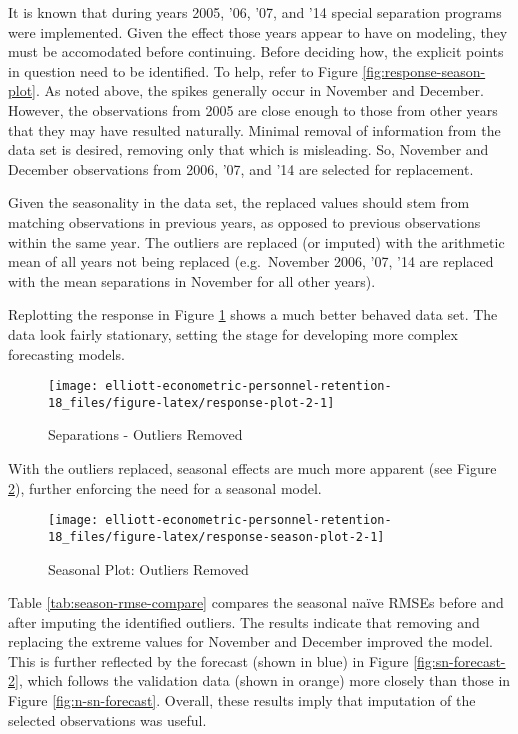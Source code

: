 \documentclass[12pt,letterpaper,toc=flat,oneside]{report}
\theoremstyle{definition}
\theoremstyle{definition}
\theoremstyle{definition}
\theoremstyle{remark}
\begin{document}
It is known that during years 2005, '06, '07, and '14 special separation
programs were implemented. Given the effect those years appear to have
on modeling, they must be accomodated before continuing. Before deciding
how, the explicit points in question need to be identified. To help,
refer to Figure \ref{fig:response-season-plot}. As noted above, the
spikes generally occur in November and December. However, the
observations from 2005 are close enough to those from other years that
they may have resulted naturally. Minimal removal of information from
the data set is desired, removing only that which is misleading. So,
November and December observations from 2006, '07, and '14 are selected
for replacement.

Given the seasonality in the data set, the replaced values should stem
from matching observations in previous years, as opposed to previous
observations within the same year. The outliers are replaced (or
imputed) with the arithmetic mean of all years not being replaced
(e.g.~November 2006, '07, '14 are replaced with the mean separations in
November for all other years).

Replotting the response in Figure \ref{fig:response-plot-2} shows a much
better behaved data set. The data look fairly stationary, setting the
stage for developing more complex forecasting models.

\begin{figure}[H]

{\centering \texttt{[image: elliott-econometric-personnel-retention-18\_files/figure-latex/response-plot-2-1]} 

}

\caption{Separations - Outliers Removed}\label{fig:response-plot-2}
\end{figure}

With the outliers replaced, seasonal effects are much more apparent (see
Figure \ref{fig:response-season-plot-2}), further enforcing the need for
a seasonal model.

\begin{figure}[H]

{\centering \texttt{[image: elliott-econometric-personnel-retention-18\_files/figure-latex/response-season-plot-2-1]} 

}

\caption{Seasonal Plot: Outliers Removed}\label{fig:response-season-plot-2}
\end{figure}

Table \ref{tab:season-rmse-compare} compares the seasonal naïve RMSEs
before and after imputing the identified outliers. The results indicate
that removing and replacing the extreme values for November and December
improved the model. This is further reflected by the forecast (shown in
blue) in Figure \ref{fig:sn-forecast-2}, which follows the validation
data (shown in orange) more closely than those in Figure
\ref{fig:n-sn-forecast}. Overall, these results imply that imputation of
the selected observations was useful.
\end{document}
